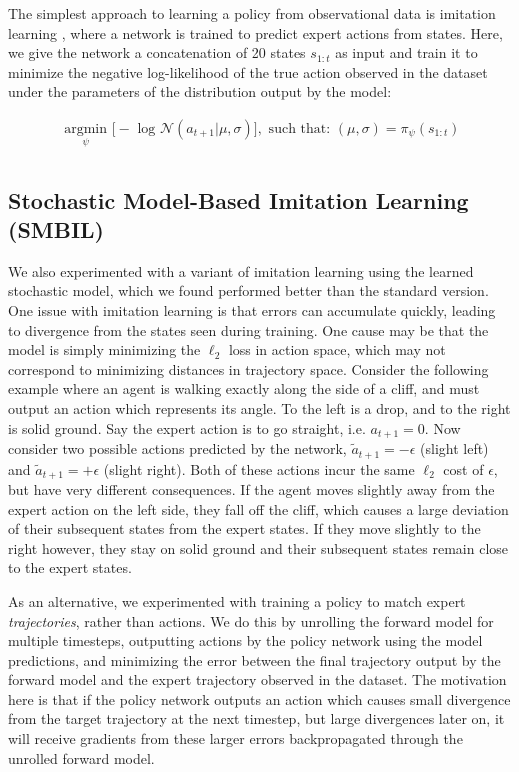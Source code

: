\documentclass{article} %
\begin{document}
  The simplest approach to learning a policy from observational data is imitation learning \citep{Pomerleau91}, where a network is trained to predict expert actions from states. Here, we give the network a concatenation of 20 states $s_{1:t}$ as input and train it to minimize the negative log-likelihood of the true action observed in the dataset under the parameters of the distribution output by the model:

    \begin{align*}
    \underset{\psi}{\mbox{ argmin }} \Big[ -\mbox{ log } \mathcal{N}(a_{t+1} | \mu, \sigma) \Big],  \mbox{ such that: } (\mu, \sigma) = \pi_\psi(s_{1:t}) \\
  \end{align*}

  \subsection{Stochastic Model-Based Imitation Learning (SMBIL)}

  We also experimented with a variant of imitation learning using the learned stochastic model, which we found performed better than the standard version. One issue with imitation learning is that errors can accumulate quickly, leading to divergence from the states seen during training.
  One cause may be that the model is simply minimizing the $\ell_2$ loss in action space, which may not correspond to minimizing distances in trajectory space.
  Consider the following example where an agent is walking exactly along the side of a cliff, and must output an action which represents its angle.
  To the left is a drop, and to the right is solid ground.
  Say the expert action is to go straight, i.e. $a_{t+1} = 0$. Now consider two possible actions predicted by the network, $\tilde{a}_{t+1} = -\epsilon$ (slight left) and $\tilde{a}_{t+1} = +\epsilon$ (slight right).
  Both of these actions incur the same $\ell_2$ cost of $\epsilon$, but have very different consequences. If the agent moves slightly away from the expert action on the left side, they fall off the cliff, which causes a large deviation of their subsequent states from the expert states. If they move slightly to the right however, they stay on solid ground and their subsequent states remain close to the expert states.

  As an alternative, we experimented with training a policy to match expert \textit{trajectories}, rather than actions.
  We do this by unrolling the forward model for multiple timesteps, outputting actions by the policy network using the model predictions, and minimizing the error between the final trajectory output by the forward model and the expert trajectory observed in the dataset.
  The motivation here is that if the policy network outputs an action which causes small divergence from the target trajectory at the next timestep, but large divergences later on, it will receive gradients from these larger errors backpropagated through the unrolled forward model.
\end{document}

